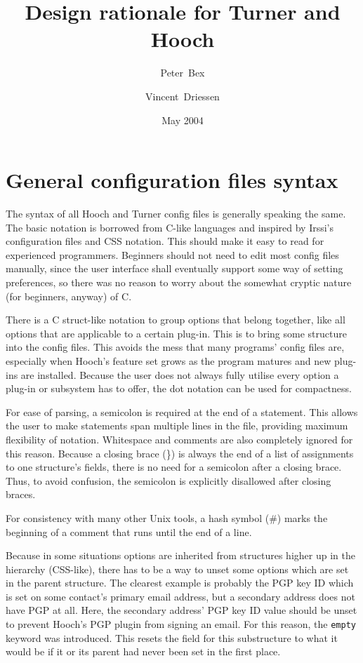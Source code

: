 \documentclass[a4paper]{article}
\title{Design rationale for Turner and Hooch}
\date{May 2004}
\author{Peter~Bex\and{}Vincent~Driessen}
\begin{document}
\maketitle

\section{General configuration files syntax}

The syntax of all Hooch and Turner config files is generally speaking the same.
The basic notation is borrowed from C-like languages and inspired by
Irssi's configuration files and CSS notation.  This should make it easy
to read for experienced programmers.  Beginners should not need to edit
most config files manually, since the user interface shall eventually
support some way of setting preferences, so there was no reason to worry
about the somewhat cryptic nature (for beginners, anyway) of C.

There is a C struct-like notation to group options that belong together,
like all options that are applicable to a certain plug-in.  This is to
bring some structure into the config files.  This avoids the mess that
many programs' config files are, especially when Hooch's feature set grows
as the program matures and new plug-ins are installed.
Because the user does not always fully utilise every option a plug-in or
subsystem has to offer, the dot notation can be used for compactness.

For ease of parsing, a semicolon is required at the end of a statement.
This allows the user to make statements span multiple lines in the file,
providing maximum flexibility of notation.  Whitespace and comments are
also completely ignored for this reason.  Because a closing brace (\}) is
always the end of a list of assignments to one structure's fields, there
is no need for a semicolon after a closing brace.  Thus, to avoid confusion,
the semicolon is explicitly disallowed after closing braces.

For consistency with many other Unix tools, a hash symbol (\#) marks the
beginning of a comment that runs until the end of a line.

Because in some situations options are inherited from structures higher
up in the hierarchy (CSS-like), there has to be a way to unset some
options which are set in the parent structure.  The clearest example is
probably the PGP key ID which is set on some contact's primary email
address, but a secondary address does not have PGP at all.  Here, the
secondary address' PGP key ID value should be unset to prevent Hooch's
PGP plugin from signing an email.  For this reason, the \texttt{empty}
keyword was introduced.  This resets the field for this substructure to
what it would be if it or its parent had never been set in the first place.
\end{document}
